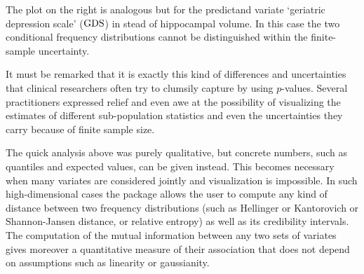 \documentclass{article}
\begin{document}
The plot on the right is analogous but for the predictand variate `geriatric depression scale' ($\mathrm{GDS}$) in stead of hippocampal volume. In this case the two conditional frequency distributions cannot be distinguished within the finite-sample uncertainty.

It must be remarked that it is exactly this kind of differences and uncertainties that clinical researchers often try to clumsily capture by using $p$-values. Several practitioners expressed relief and even awe at the possibility of visualizing the estimates of different sub-population statistics and even the uncertainties they carry because of finite sample size.

The quick analysis above was purely qualitative, but concrete numbers, such as quantiles and expected values, can be given instead. This becomes necessary when many variates are considered jointly and visualization is impossible. In such high-dimensional cases the package allows the user to compute any kind of distance between two frequency distributions (such as Hellinger or Kantorovich or Shannon-Jansen distance, or relative entropy) as well as its credibility intervals. The computation of the mutual information between any two sets of variates gives moreover a quantitative measure of their association that does not depend on assumptions such as linearity or gaussianity.

\medskip
\end{document}
